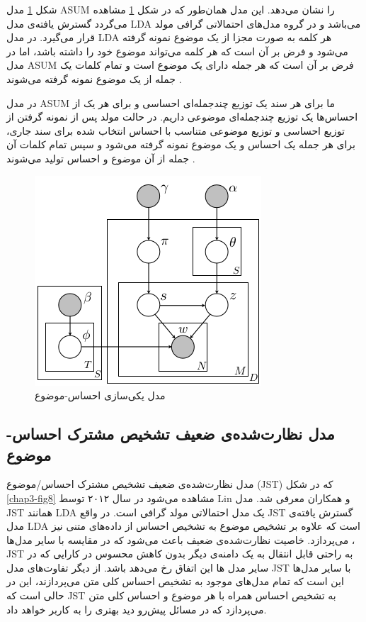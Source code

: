 	شکل
	\ref{chap3-fig9}
	مدل
	ASUM
	را نشان می‌‌دهد. این مدل همان‌طور که در شکل
	\ref{chap3-fig9}
	مشاهده می‌‌گردد گسترش یافته‌ی مدل
	LDA
	می‌باشد
	\cite{jo2011aspect}
	و در گروه مدل‌های احتمالاتی گرافی‌ مولد قرار می‌‌گیرد. در مدل
	LDA
	هر کلمه به صورت مجزا از یک موضوع نمونه گرفته می‌‌شود و فرض بر آن است که هر کلمه می‌‌تواند موضوع خود را داشته باشد، اما در مدل
	ASUM
	فرض بر آن است که هر جمله دارای یک موضوع است و تمام کلمات یک جمله از یک موضوع نمونه گرفته می‌‌شوند
	\cite{jo2011aspect}.
	
در مدل
ASUM
ما برای هر سند یک توزیع چندجمله‌ای احساسی‌ و برای هر یک از احساس‌ها یک توزیع چندجمله‌ای موضوعی داریم. در حالت مولد پس از نمونه گرفتن از توزیع احساسی‌ و توزیع موضوعی متناسب با احساس انتخاب شده برای سند جاری، برای هر جمله یک احساس و یک موضوع نمونه گرفته ‌می‌‌شود و سپس تمام کلمات آن جمله از آن موضوع و احساس تولید می‌‌شوند
\cite{jo2011aspect}.

\begin{figure}[!t]
	\centering
	\includegraphics[scale=0.5]{chap3-img/ASUM}
	\caption{مدل یکی‌سازی احساس-موضوع \cite{jo2011aspect}}
	\label{chap3-fig9}
\end{figure}


	\subsection{مدل نظارت‌شده‌ی ضعیف تشخیص مشترک احساس-موضوع}
	\label{chap3sec4sub1}
مدل نظارت‌شده‌ی ضعیف تشخیص مشترک احساس/موضوع
(JST) \cite{lin2012weakly}
 که در شکل 
\ref{chap3-fig8}
مشاهده می‌‌شود در سال ۲۰۱۲ توسط
 Lin
 و همکاران معرفی‌ شد. مدل
 JST
  همانند 
 LDA
 یک مدل احتمالاتی مولد گرافی است. در واقع
 JST
 گسترش یافته‌ی‌ مدل 
 LDA
 است که علاوه بر تشخیص موضوع به تشخیص احساس از داده‌های متنی نیز می‌پردازد.  خاصیت نظارت‌شده‌ی ضعیف باعث می‌‌شود که در مقایسه با سایر مدل‌ها
 ، JST
  به راحتی‌ قابل انتقال به یک دامنه‌ی دیگر بدون کاهش محسوس در کارایی که در سایر مدل ها این اتفاق رخ می‌‌دهد باشد. از دیگر تفاوت‌های مدل
   JST
    با سایر مدل‌ها این است که تمام مدل‌های موجود به تشخیص احساس کلی‌ متن می‌پردازند، این در حالی‌ است که
     JST
      به تشخیص احساس همراه با هر موضوع و احساس کلی‌ متن می‌‌پردازد که در مسائل پیش‌رو دید بهتری را به کاربر خواهد داد.
 
